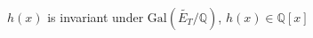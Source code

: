 \documentclass[preview]{standalone}
\begin{document}
\begin{center}
$h(x)$ is invariant under $\text{Gal}\left(\widetilde{E_T}/\mathbb{Q}\right)$, $h(x) \in \mathbb{Q}[x]$
\end{center}
\end{document}
